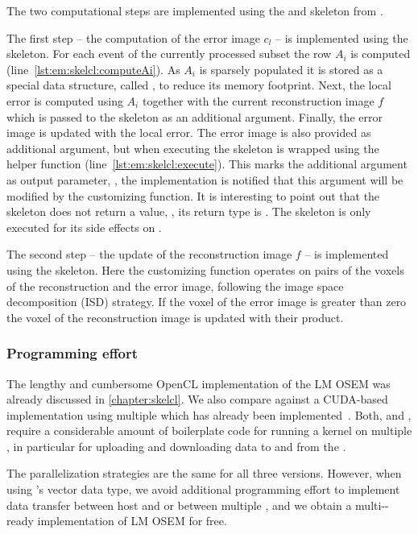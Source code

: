 The two computational steps are implemented using the \map and \zip skeleton from \SkelCL.

The first step -- the computation of the error image $c_l$ -- is implemented using the \map skeleton.
For each event  of the currently processed subset the row $A_i$ is computed (line~\ref{lst:em:skelcl:computeAi}).
As $A_i$ is sparsely populated it is stored as a special data structure, called , to reduce its memory footprint.
Next, the local error is computed using $A_i$ together with the current reconstruction image $f$ which is passed to the \map skeleton as an additional argument.
Finally, the error image  is updated with the local error.
The error image is also provided as additional argument, but when executing the \map skeleton  is wrapped using the  helper function (line~\ref{lst:em:skelcl:execute}).
This marks the additional argument as output parameter, \ie, the \SkelCL implementation is notified that this argument will be modified by the customizing function.
It is interesting to point out that the \map skeleton does not return a value, \ie, its return type is .
The skeleton is only executed for its side effects on .

The second step -- the update of the reconstruction image $f$ -- is implemented using the \zip skeleton.
Here the customizing function operates on pairs of the voxels of the reconstruction and the error image, following the image space decomposition (ISD) strategy.
If the voxel of the error image is greater than zero the voxel of the reconstruction image is updated with their product.







\subsubsection*{Programming effort}
The lengthy and cumbersome OpenCL implementation of the LM OSEM was already discussed in \autoref{chapter:skelcl}.
We also compare against a CUDA-based implementation using multiple \GPUs which has already been implemented~\cite{SchellmannGoMeKoScWuBu2009}.
Both, \CUDA and \OpenCL, require a considerable amount of boilerplate code for running a kernel on multiple \GPUs, in particular for uploading and downloading data to and from the \GPUs.

The parallelization strategies are the same for all three versions.
However, when using \SkelCL's vector data type, we avoid additional programming effort to implement data transfer between host and \GPU or between multiple \GPUs, and we obtain a multi-\GPU-ready implementation of LM OSEM for free.

